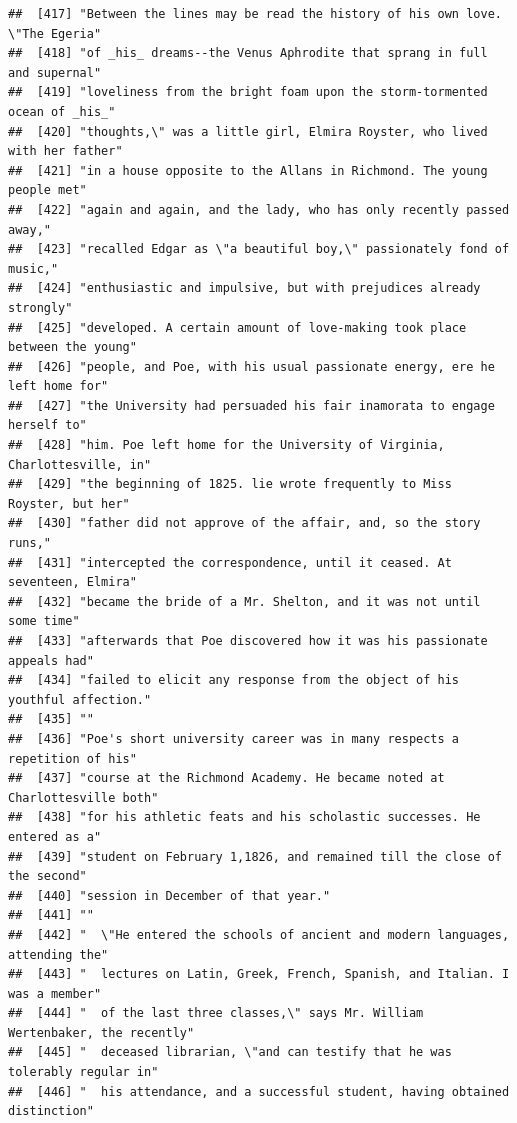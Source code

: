 \documentclass{article}\usepackage[]{graphicx}\usepackage[]{color}
\makeatletter
\newenvironment{kframe}{%
 \def\at@end@of@kframe{}%
 \ifinner\ifhmode%
  \def\at@end@of@kframe{\end{minipage}}%
  \begin{minipage}{\columnwidth}%
 \fi\fi%
 \def\FrameCommand##1{\hskip\@totalleftmargin \hskip-\fboxsep
 \colorbox{shadecolor}{##1}\hskip-\fboxsep
     \hskip-\linewidth \hskip-\@totalleftmargin \hskip\columnwidth}%
 \MakeFramed {\advance\hsize-\width
   \@totalleftmargin\z@ \linewidth\hsize
   \@setminipage}}%
 {\par\unskip\endMakeFramed%
 \at@end@of@kframe}
\newenvironment{knitrout}{}{} %
\makeatother
\begin{document}
\begin{knitrout}
\begin{kframe}
\begin{verbatim}
##  [417] "Between the lines may be read the history of his own love. \"The Egeria"     
##  [418] "of _his_ dreams--the Venus Aphrodite that sprang in full and supernal"       
##  [419] "loveliness from the bright foam upon the storm-tormented ocean of _his_"     
##  [420] "thoughts,\" was a little girl, Elmira Royster, who lived with her father"    
##  [421] "in a house opposite to the Allans in Richmond. The young people met"         
##  [422] "again and again, and the lady, who has only recently passed away,"           
##  [423] "recalled Edgar as \"a beautiful boy,\" passionately fond of music,"          
##  [424] "enthusiastic and impulsive, but with prejudices already strongly"            
##  [425] "developed. A certain amount of love-making took place between the young"     
##  [426] "people, and Poe, with his usual passionate energy, ere he left home for"     
##  [427] "the University had persuaded his fair inamorata to engage herself to"        
##  [428] "him. Poe left home for the University of Virginia, Charlottesville, in"      
##  [429] "the beginning of 1825. lie wrote frequently to Miss Royster, but her"        
##  [430] "father did not approve of the affair, and, so the story runs,"               
##  [431] "intercepted the correspondence, until it ceased. At seventeen, Elmira"       
##  [432] "became the bride of a Mr. Shelton, and it was not until some time"           
##  [433] "afterwards that Poe discovered how it was his passionate appeals had"        
##  [434] "failed to elicit any response from the object of his youthful affection."    
##  [435] ""                                                                            
##  [436] "Poe's short university career was in many respects a repetition of his"      
##  [437] "course at the Richmond Academy. He became noted at Charlottesville both"     
##  [438] "for his athletic feats and his scholastic successes. He entered as a"        
##  [439] "student on February 1,1826, and remained till the close of the second"       
##  [440] "session in December of that year."                                           
##  [441] ""                                                                            
##  [442] "  \"He entered the schools of ancient and modern languages, attending the"   
##  [443] "  lectures on Latin, Greek, French, Spanish, and Italian. I was a member"    
##  [444] "  of the last three classes,\" says Mr. William Wertenbaker, the recently"   
##  [445] "  deceased librarian, \"and can testify that he was tolerably regular in"    
##  [446] "  his attendance, and a successful student, having obtained distinction"     

\end{verbatim}
\end{kframe}
\end{knitrout}
\end{document}
